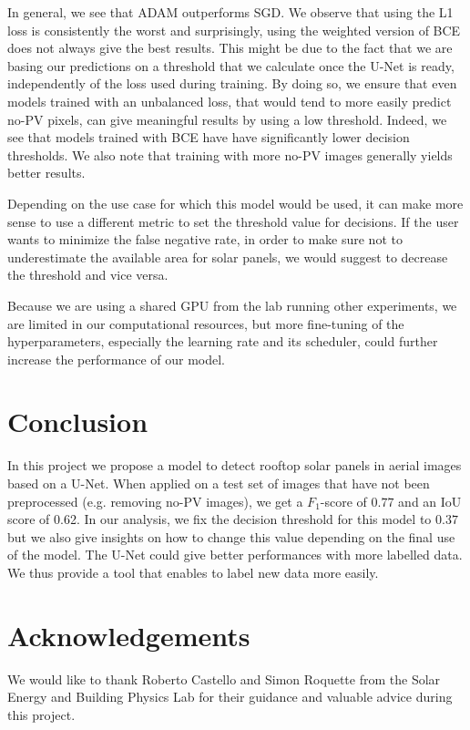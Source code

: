 \documentclass[10pt,conference]{IEEEtran}
\begin{document}
In general, we see that ADAM outperforms SGD.
We observe that using the L1 loss is consistently the worst and surprisingly, using the weighted version of BCE does not always give the best results.
This might be due to the fact that we are basing our predictions on a threshold that we calculate once the U-Net is ready, independently of the loss used during training.
By doing so, we ensure that even models trained with an unbalanced loss, that would tend to more easily predict no-PV pixels, can give meaningful results by using a low threshold.
Indeed, we see that models trained with BCE have have significantly lower decision thresholds.
We also note that training with more no-PV images generally yields better results.

Depending on the use case for which this model would be used, it can make more sense to use a different metric to set the threshold value for decisions.
If the user wants to minimize the false negative rate, in order to make sure not to underestimate the available area for solar panels, we would suggest to decrease the threshold and vice versa.

Because we are using a shared GPU from the lab running other experiments, we are limited in our computational resources, but more fine-tuning of the hyperparameters, especially the learning rate and its scheduler, could further increase the performance of our model.

\section{Conclusion}
In this project we propose a model to detect rooftop solar panels in aerial images based on a U-Net. When applied on a test set of images that have not been preprocessed (e.g. removing no-PV images), we get a $F_1$-score of $0.77$ and an IoU score of 0.62. 
In our analysis, we fix the decision threshold for this model to $0.37$ but we also give insights on how to change this value depending on the final use of the model.
The U-Net could give better performances with more labelled data. We thus provide a tool that enables to label new data more easily.

\section*{Acknowledgements}
We would like to thank Roberto Castello and Simon Roquette from the Solar Energy and Building Physics Lab for their guidance and valuable advice during this project.
%
%
\printbibliography
\end{document}
